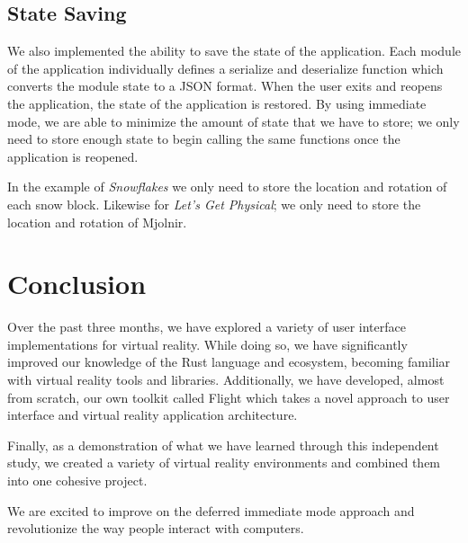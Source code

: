 \documentclass[conference,12pt]{IEEEtran}
\begin{document}
\subsection{State Saving}

We also implemented the ability to save the state of the application. Each
module of the application individually defines a serialize and deserialize
function which converts the module state to a JSON format. When the user exits
and reopens the application, the state of the application is restored. By using
immediate mode, we are able to minimize the amount of state that we have to
store; we only need to store enough state to begin calling the same functions
once the application is reopened.

In the example of \textit{Snowflakes} we only need to store the location and
rotation of each snow block. Likewise for \textit{Let's Get Physical}; we only
need to store the location and rotation of Mjolnir.

\section{Conclusion}\label{sec:conclusion}

Over the past three months, we have explored a variety of user interface
implementations for virtual reality. While doing so, we have significantly
improved our knowledge of the Rust language and ecosystem, becoming familiar
with virtual reality tools and libraries. Additionally, we have developed,
almost from scratch, our own toolkit called Flight which takes a novel approach
to user interface and virtual reality application architecture.

Finally, as a demonstration of what we have learned through this independent
study, we created a variety of virtual reality environments and combined them
into one cohesive project.

We are excited to improve on the deferred immediate mode approach and
revolutionize the way people interact with computers.

{\printbibliography}
\end{document}

